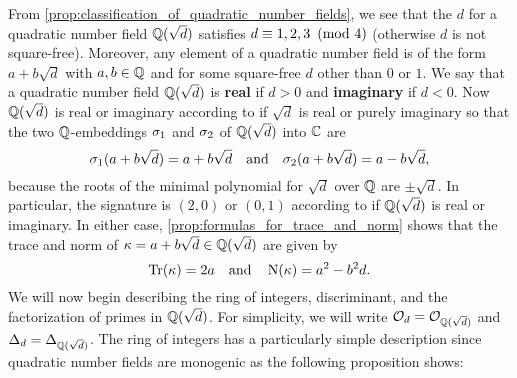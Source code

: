     From \cref{prop:classification_of_quadratic_number_fields}, we see that the $d$ for a quadratic number field $\mathbb{Q}(\sqrt{d})$ satisfies $d \equiv 1,2,3 \ \left(\text{mod }4\right)$ (otherwise $d$ is not square-free). Moreover, any element of a quadratic number field is of the form $a+b\sqrt{d}$ with $a,b \in \mathbb{Q}$ and for some square-free $d$ other than $0$ or $1$. We say that a quadratic number field $\mathbb{Q}(\sqrt{d})$ is \textbf{real} if $d > 0$ and \textbf{imaginary} if $d < 0$. Now $\mathbb{Q}(\sqrt{d})$ is real or imaginary according to if $\sqrt{d}$ is real or purely imaginary so that the two $\mathbb{Q}$-embeddings $\sigma_{1}$ and $\sigma_{2}$ of $\mathbb{Q}(\sqrt{d})$ into $\mathbb{C}$ are
    \[
      \sigma_{1}(a+b\sqrt{d}) = a+b\sqrt{d} \quad \text{and} \quad \sigma_{2}(a+b\sqrt{d}) = a-b\sqrt{d},
    \]
    because the roots of the minimal polynomial for $\sqrt{d}$ over $\mathbb{Q}$ are $\pm\sqrt{d}$. In particular, the signature is $(2,0)$ or $(0,1)$ according to if $\mathbb{Q}(\sqrt{d})$ is real or imaginary. In either case, \cref{prop:formulas_for_trace_and_norm} shows that the trace and norm of $\kappa = a+b\sqrt{d} \in \mathbb{Q}(\sqrt{d})$ are given by
    \[
      \operatorname{\mathrm{Tr}}(\kappa) = 2a \quad \text{and} \quad \operatorname{\mathrm{N}}(\kappa) = a^{2}-b^{2}d.
    \]
    We will now begin describing the ring of integers, discriminant, and the factorization of primes in $\mathbb{Q}(\sqrt{d})$. For simplicity, we will write $\mathcal{O}_{d} = \mathcal{O}_{\mathbb{Q}(\sqrt{d})}$ and $\Delta_{d} = \Delta_{\mathbb{Q}(\sqrt{d})}$. The ring of integers has a particularly simple description since quadratic number fields are monogenic as the following proposition shows:
    
